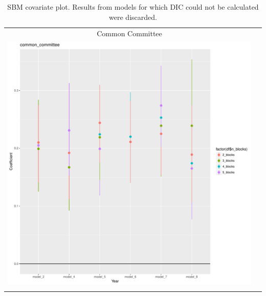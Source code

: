 \documentclass[fleqn,12pt]{wlscirep}
\begin{document}
\clearpage
\begin{longtable}[!h]{c@{\hskip 0cm}c}
Common Committee \\
\includegraphics[height=.75\textheight, clip=true, trim=.5cm .5cm 0cm .6cm]{figures/rl_plots2/common_committee.pdf}   \\
\caption{\label{fig:SBM_plot_com} SBM covariate plot. Results from models for which DIC could not be calculated were discarded.}
\end{longtable}
\end{document}
